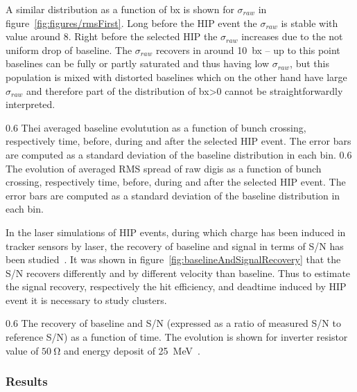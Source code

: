 A similar distribution as a function of bx is shown for $\sigma_{raw}$ in figure~\ref{fig:figures/rmsFirst}. Long before the HIP event the $\sigma_{raw}$ is stable with value around 8. Right before the selected HIP the $\sigma_{raw}$ increases due to the not uniform drop of baseline. The $\sigma_{raw}$ recovers in around 10~bx --  up to this point baselines can be fully or partly saturated and thus having low $\sigma_{raw}$, but this population is mixed with distorted baselines which on the other hand have large $\sigma_{raw}$ and therefore part of the distribution of bx>0 cannot be straightforwardly interpreted.


                 {0.6}       %
                 {Thei averaged baseline evolutution as a function of bunch crossing, respectively time, before, during and after the selected HIP event. The error bars are computed as a standard deviation of the baseline distribution in each bin.  } %
                 {0.6}       %
                 {The evolution of averaged RMS spread of raw digis as a function of bunch crossing, respectively time, before, during and after the selected HIP event. The error bars are computed as a standard deviation of the baseline distribution in each bin.  } %


In the laser simulations of HIP events, during which charge has been induced in tracker sensors by laser, the recovery of baseline and signal in terms of S/N has been studied~\cite{Adam:2005pz}. It was shown in figure~\ref{fig:baselineAndSignalRecovery} that the S/N recovers differently and by different velocity than baseline. Thus to estimate the signal recovery, respectively the hit efficiency, and deadtime induced by HIP event it is necessary to study clusters.

                 {0.6}       %
                 {The recovery of baseline and S/N (expressed as a ratio of measured S/N to reference S/N) as a function of time. The evolution is shown for inverter resistor value of $50~\mathrm{\Omega}$ and energy deposit of 25~MeV~\cite{Adam:2005pz}.} %

\subsubsection{Results}

